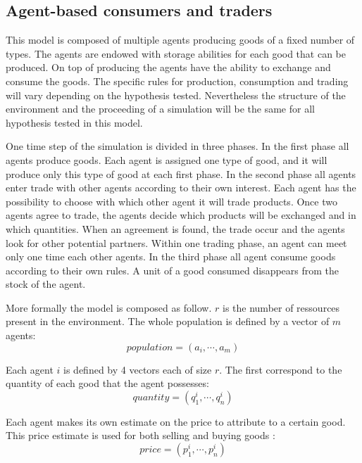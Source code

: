 \documentclass{wscpaperproc}
\begin{document}
\subsection{Agent-based consumers and traders}

This model is composed of multiple agents producing goods of a fixed number of types. The agents are endowed with storage abilities for each good that can be produced. On top of	producing the agents have the ability to exchange and consume the goods. The specific rules for production, consumption and trading will vary depending on the hypothesis tested. Nevertheless the structure of the environment and the proceeding of a simulation will be the same for all hypothesis tested in this model.

One time step of the simulation is divided in three phases. In the first phase all agents produce goods. Each agent is assigned one type of good, and it will produce only this type of good at each first phase. In the second phase all agents enter trade with other agents according to their own interest. Each agent has the possibility to choose with which other agent it will trade products. Once two agents agree to trade, the agents decide which products will be exchanged and in which quantities. When an agreement is found, the trade occur and the agents look for other potential partners. Within one trading phase, an agent can meet only one time each other agents. In the third phase all agent consume goods according to their own rules. A unit of a good consumed disappears from the stock of the agent.


More formally the model is composed as follow. $r$ is the number of ressources present in the environment. The whole population is defined by a vector of $m$ agents: 
		$$ population = (a_i, \cdots ,a_m) $$
		
Each agent $i$ is defined by 4 vectors each of size $r$. The first correspond to the quantity of each good that the agent possesses: $$ quantity = (q^i_1,\cdots,q^i_n) $$

Each agent makes its own estimate on the price to attribute to a certain good. This price estimate is used for both selling and buying goods :
$$ price = (p^i_1,\cdots,p^i_n) $$
 
\end{document}
